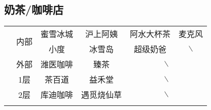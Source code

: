 \subsection[奶茶/咖啡店]{奶茶/咖啡店}
\begin{table}[!ht]
    \centering
    \begin{tabular}{|c|c|c|c|c|c|}
        \Xhline{1.2pt}
        \multirow{3}{*}{食堂} & \multirow{2}{*}{内部}               & 蜜雪冰城         & 沪上阿姨  %
                            & 阿水大杯茶                             & 麦克风                  \\
        \cline{3-6}
                            &                                   & 小度           & 冰雪岛   %
                            & 超级奶爸                              & $\backslash$         \\
        \cline{2-6}
                            & 外部                                & 潍医咖啡         & 臻茶    %
                            & \multicolumn{2}{c|}{$\backslash$}                        \\
        \Xhline{1.2pt}
        \multirow{2}{*}{大服} & 1层                                & 茶百道          & 益禾堂   %
                            & \multicolumn{2}{c|}{$\backslash$}                        \\
        \cline{2-6}
                            & 2层                                & 库迪咖啡         & 遇觅烧仙草 %
                            & \multicolumn{2}{c|}{$\backslash$}                        \\
        \Xhline{1.2pt}
    \end{tabular}
\end{table}

\newpage
